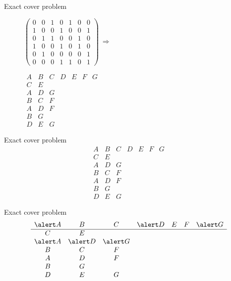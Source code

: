 \documentclass{beamer}
\begin{document}
%
\begin{frame}{Exact cover problem}
  \centering
  \begin{figure}[!htb]
    \begin{minipage}{.6\textwidth}
      \centering
      $\left(\begin{array}{ccccccc}
    0&0&1&0&1&0&0\\
    1&0&0&1&0&0&1\\
    0&1&1&0&0&1&0\\
    1&0&0&1&0&1&0\\
    0&1&0&0&0&0&1\\
    0&0&0&1&1&0&1
  \end{array}\right)\ \Rightarrow$
    \end{minipage}%
    \begin{minipage}{.4\textwidth}
      \centering
  $
  \begin{array}{ccccccc}
    A & B & C & D & E & F & G\\
    \hline
    C & E &&&&&\\
    A & D & G &&&&\\
    B & C & F &&&&\\
    A & D & F &&&&\\
    B & G &&&&&\\
    D & E & G &&&&
  \end{array}
  $
    \end{minipage}
\end{figure}
\end{frame}

\renewcommand\arraystretch{1.3}
%
\begin{frame}{Exact cover problem} 
  $$
  \begin{array}{ccccccc}
    A & B & C & D & E & F & G\\
    \hline
    C & E &&&&&\\
    A & D & G &&&&\\
    B & C & F &&&&\\
    A & D & F &&&&\\
    B & G &&&&&\\
    D & E & G &&&&
  \end{array}
  $$
\end{frame}

%
\begin{frame}{Exact cover problem} 
  $$
  \begin{array}{ccccccc}
    \alert A & B & C & \alert D & E & F & \alert G\\
    \hline
    C & E &&&&&\\
    \alert A & \alert D & \alert G &&&&\\
    B & C & F &&&&\\
    A & D & F &&&&\\
    B & G &&&&&\\
    D & E & G &&&&
  \end{array}
  $$
\end{frame}
\end{document}
